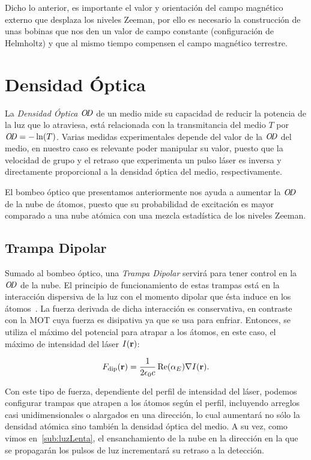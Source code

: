 \p Dicho lo anterior, es importante el valor y orientación del campo magnético externo que desplaza los niveles Zeeman, por ello es necesario la construcción de unas bobinas que nos den un valor de campo constante (configuración de Helmholtz) y que al mismo tiempo compensen el campo magnético terrestre.

\section{\label{sec:densidadOptica}Densidad Óptica}

La \emph{Densidad Óptica} $\OD$ de un medio mide su capacidad de reducir la potencia de la luz que lo atraviesa, está relacionada con la transmitancia del medio $T$ por $\OD=-\ln(T)$. Varias medidas experimentales depende del valor de la $\OD$ del medio, en nuestro caso es relevante poder manipular su valor, puesto que la velocidad de grupo y el retraso que experimenta un pulso láser es inversa y directamente proporcional a la densidad óptica del medio, respectivamente.

\p El bombeo óptico que presentamos anteriormente nos ayuda a aumentar la $\OD$ de la nube de átomos, puesto que su probabilidad de excitación es mayor comparado a una nube atómica con una mezcla estadística de los niveles Zeeman.

\subsection{\label{sub:trampaDipolar}Trampa Dipolar}

Sumado al bombeo óptico, una \emph{Trampa Dipolar} servirá para tener control en la $\OD$ de la nube. El principio de funcionamiento de estas trampas está en la interacción dispersiva de la luz con el momento dipolar que ésta induce en los átomos~\cite{grimm}. La fuerza derivada de dicha interacción es conservativa, en contraste con la MOT cuya fuerza es disipativa ya que se usa para enfriar. Entonces, se utiliza el máximo del potencial para atrapar a los átomos, en este caso, el máximo de intensidad del láser $I(\text{\textbf{r}})$:

\begin{equation}
\label{ec:fuerzaDipolar}
F_{\mathrm{dip}}(\text{\textbf{r}})=\dfrac{1}{2\epsilon_{0}c}\operatorname{Re}\hspace{-0.6mm}{\left(\alpha_{E}\right)}\nabla I(\text{\textbf{r}}).
\end{equation}

Con este tipo de fuerza, dependiente del perfil de intensidad del láser, podemos configurar trampas que atrapen a los átomos según el perfil, incluyendo arreglos casi unidimensionales o alargados en una dirección, lo cual aumentará no sólo la densidad atómica sino también la densidad óptica del medio. A su vez, como vimos en~\ref{sub:luzLenta}, el ensanchamiento de la nube en la dirección en la que se propagarán los pulsos de luz incrementará su retraso a la detección.

